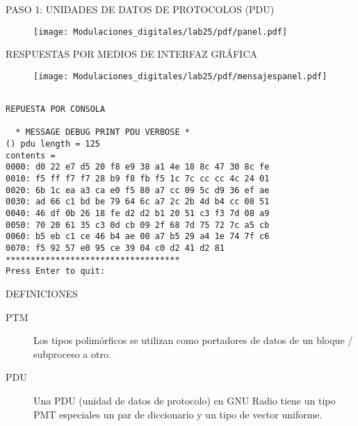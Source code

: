 \begin{frame}{PASO 1: UNIDADES DE DATOS DE PROTOCOLOS (PDU)}

\begin{figure}[H]
\centering
\vspace{-3mm}
\texttt{[image: Modulaciones\_digitales/lab25/pdf/panel.pdf]}
\end{figure}

\end{frame}

\begin{frame}{RESPUESTAS POR MEDIOS DE INTERFAZ GRÁFICA}

\begin{figure}[H]
\centering
\vspace{-3mm}
\texttt{[image: Modulaciones\_digitales/lab25/pdf/mensajespanel.pdf]}
\end{figure}

\end{frame}




\begin{verbatim}

REPUESTA POR CONSOLA 

  * MESSAGE DEBUG PRINT PDU VERBOSE *
() pdu length = 125
contents =
0000: d0 22 e7 d5 20 f8 e9 38 a1 4e 18 8c 47 30 8c fe
0010: f5 ff f7 f7 28 b9 f8 fb f5 1c 7c cc cc 4c 24 01
0020: 6b 1c ea a3 ca e0 f5 80 a7 cc 09 5c d9 36 ef ae
0030: ad 66 c1 bd be 79 64 6c a7 2c 2b 4d b4 cc 08 51
0040: 46 df 0b 26 18 fe d2 d2 b1 20 51 c3 f3 7d 08 a9
0050: 70 20 61 35 c3 0d cb 09 2f 68 7d 75 72 7c a5 cb
0060: b5 eb c1 ce 46 b4 ae 00 a7 b5 29 a4 1e 74 7f c6
0070: f5 92 57 e0 95 ce 39 04 c0 d2 41 d2 81
***********************************
Press Enter to quit:

\end{verbatim}


\begin{frame}{DEFINICIONES}


\begin{description}

    \item[PTM] Los tipos polimórficos se utilizan como portadores de datos de un bloque
/ subproceso a otro.\\ \vspace{2mm}
    \item[PDU]Una PDU (unidad de datos de protocolo) en GNU Radio tiene un tipo
PMT especiales un par de diccionario y un tipo de vector uniforme.\\ \vspace{2mm}

\end{description}
\end{frame}

